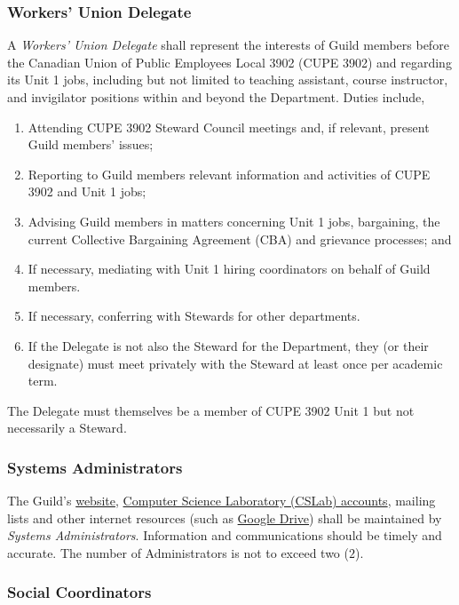 \subsubsection{Workers’ Union Delegate}
A \textit{Workers' Union Delegate} shall represent the interests of Guild
members before the Canadian Union of Public Employees Local 3902 (CUPE 3902)
and regarding its Unit 1 jobs, including but not limited to teaching assistant,
course instructor, and invigilator positions within and beyond the Department.
Duties include,
\begin{enumerate}
      \item Attending CUPE 3902 Steward Council meetings and, if relevant, present Guild
            members' issues;
      \item Reporting to Guild members relevant information and activities of CUPE 3902 and
            Unit 1 jobs;
      \item Advising Guild members in matters concerning Unit 1 jobs, bargaining, the
            current Collective Bargaining Agreement (CBA) and grievance processes; and
      \item If necessary, mediating with Unit 1 hiring coordinators on behalf of Guild
            members.
      \item If necessary, conferring with Stewards for other departments.
      \item If the Delegate is not also the Steward for the Department, they (or their
            designate) must meet privately with the Steward at least once per academic
            term.
\end{enumerate}
The Delegate must themselves be a member of CUPE 3902 Unit 1 but not necessarily a Steward.

\subsubsection{Systems Administrators}\label{sec:administrators}

The Guild's \href{https://www.cs.toronto.edu/csgsbs/}{website},
\href{https://support.cs.toronto.edu/}{Computer Science Laboratory (CSLab)
      accounts}, mailing lists and other internet resources (such as
\href{https://drive.google.com/}{Google Drive}) shall be maintained by
\textit{Systems Administrators}. Information and communications should be
timely and accurate. The number of Administrators is not to exceed two ($2$).

\subsubsection{Social Coordinators}\label{sec:coordinators}

